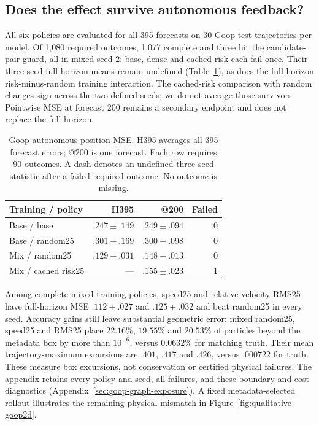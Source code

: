 \subsection{Does the effect survive autonomous feedback?}
All six policies are evaluated for all 395 forecasts on 30 Goop test trajectories per model. Of 1,080 required outcomes, 1,077 complete and three hit the candidate-pair guard, all in mixed seed 2: base, dense and cached risk each fail once. Their three-seed full-horizon means remain undefined (Table~\ref{tab:goop-rollouts}), as does the full-horizon risk-minus-random training interaction. The cached-risk comparison with random changes sign across the two defined seeds; we do not average those survivors. Pointwise MSE at forecast 200 remains a secondary endpoint and does not replace the full horizon.

\begin{table}[t]
\centering\small
\caption{Goop autonomous position MSE. H395 averages all 395 forecast errors; @200 is one forecast. Each row requires 90 outcomes. A dash denotes an undefined three-seed statistic after a failed required outcome. No outcome is missing.}
\label{tab:goop-rollouts}
\setlength{\tabcolsep}{3pt}
\begin{tabular}{lrrr}
\toprule
Training / policy & H395 & @200 & Failed\\
\midrule
Base / base & $.247\pm.149$ & $.249\pm.094$ & 0\\
Base / random25 & $.301\pm.169$ & $.300\pm.098$ & 0\\
Mix / random25 & $.129\pm.031$ & $.148\pm.013$ & 0\\
Mix / cached risk25 & --- & $.155\pm.023$ & 1\\
\bottomrule
\end{tabular}
\end{table}

Among complete mixed-training policies, speed25 and relative-velocity-RMS25 have full-horizon MSE $.112\pm.027$ and $.125\pm.032$ and beat random25 in every seed. Accuracy gains still leave substantial geometric error: mixed random25, speed25 and RMS25 place $22.16\%$, $19.55\%$ and $20.53\%$ of particles beyond the metadata box by more than $10^{-6}$, versus $0.0632\%$ for matching truth. Their mean trajectory-maximum excursions are $.401$, $.417$ and $.426$, versus $.000722$ for truth. These measure box excursions, not conservation or certified physical failures. The appendix retains every policy and seed, all failures, and these boundary and cost diagnostics (Appendix~\ref{sec:goop-graph-exposure}). A fixed metadata-selected rollout illustrates the remaining physical mismatch in Figure~\ref{fig:qualitative-goop2d}.

